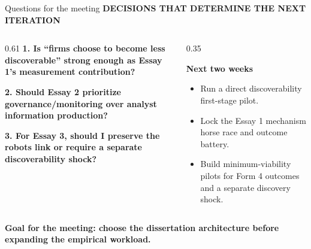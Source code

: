 \documentclass[aspectratio=169,10pt]{beamer}
\newcommand{\eyebrow}[1]{%
  {\color{accent}\fontsize{7.3}{9}\selectfont\bfseries\MakeUppercase{#1}}\par\vspace{0.10cm}%
}
\newcommand{\smallhead}[1]{%
  {\fontsize{11}{13}\selectfont\bfseries #1}\par\vspace{0.08cm}%
}
\newcommand{\smalltext}{\fontsize{8.1}{10.2}\selectfont}
\begin{document}
\begin{frame}[t]{Questions for the meeting}
\eyebrow{Decisions that determine the next iteration}

\begin{columns}[T,onlytextwidth]
  \begin{column}{0.61\textwidth}
    {\fontsize{11.6}{14}\selectfont\bfseries
    1. Is ``firms choose to become less discoverable'' strong enough as Essay 1's measurement contribution?}\par
    \vspace{0.25cm}
    {\fontsize{11.6}{14}\selectfont\bfseries
    2. Should Essay 2 prioritize governance/monitoring over analyst information production?}\par
    \vspace{0.25cm}
    {\fontsize{11.6}{14}\selectfont\bfseries
    3. For Essay 3, should I preserve the robots link or require a separate discoverability shock?}\par
  \end{column}
  \begin{column}{0.35\textwidth}
    \colorbox{panel}{\parbox{0.90\linewidth}{%
      \smallhead{Next two weeks}
      {\smalltext
      \begin{itemize}\setlength\itemsep{0.13cm}
        \item Run a direct discoverability first-stage pilot.
        \item Lock the Essay 1 mechanism horse race and outcome battery.
        \item Build minimum-viability pilots for Form 4 outcomes and a separate discovery shock.
      \end{itemize}}
    }}
  \end{column}
\end{columns}

\vspace{0.25cm}
{\color{accent}\fontsize{13.2}{16}\selectfont\bfseries
Goal for the meeting: choose the dissertation architecture before expanding the empirical workload.}
\end{frame}
\end{document}
